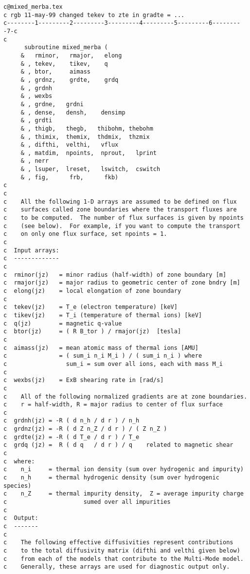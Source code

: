 \begin{verbatim}
c@mixed_merba.tex
c rgb 11-may-99 changed tekev to zte in gradte = ...
c--------1---------2---------3---------4---------5---------6---------7-c
c
      subroutine mixed_merba (
     &   rminor,   rmajor,   elong
     & , tekev,    tikev,    q       
     & , btor,     aimass
     & , grdnz,    grdte,    grdq 
     & , grdnh
     & , wexbs
     & , grdne,   grdni
     & , dense,   densh,    densimp     
     & , grdti  
     & , thigb,   thegb,   thibohm, thebohm
     & , thimix,  themix,  thdmix,  thzmix
     & , difthi,  velthi,   vflux
     & , matdim,  npoints,  nprout,   lprint  
     & , nerr
     & , lsuper,  lreset,   lswitch,  cswitch
     & , fig,      frb,      fkb)
c
c
c    All the following 1-D arrays are assumed to be defined on flux
c    surfaces called zone boundaries where the transport fluxes are
c    to be computed.  The number of flux surfaces is given by npoints
c    (see below).  For example, if you want to compute the transport
c    on only one flux surface, set npoints = 1.
c
c  Input arrays:
c  -------------
c
c  rminor(jz)   = minor radius (half-width) of zone boundary [m]
c  rmajor(jz)   = major radius to geometric center of zone bndry [m]
c  elong(jz)    = local elongation of zone boundary
c
c  tekev(jz)    = T_e (electron temperature) [keV] 
c  tikev(jz)    = T_i (temperature of thermal ions) [keV]
c  q(jz)        = magnetic q-value
c  btor(jz)     = ( R B_tor ) / rmajor(jz)  [tesla]
c
c  aimass(jz)   = mean atomic mass of thermal ions [AMU]
c               = ( sum_i n_i M_i ) / ( sum_i n_i ) where
c                 sum_i = sum over all ions, each with mass M_i
c
c  wexbs(jz)    = ExB shearing rate in [rad/s]
c
c    All of the following normalized gradients are at zone boundaries.
c    r = half-width, R = major radius to center of flux surface
c
c  grdnh(jz) = -R ( d n_h / d r ) / n_h
c  grdnz(jz) = -R ( d Z n_Z / d r ) / ( Z n_Z )
c  grdte(jz) = -R ( d T_e / d r ) / T_e
c  grdq (jz) =  R ( d q   / d r ) / q    related to magnetic shear
c
c  where:
c    n_i     = thermal ion density (sum over hydrogenic and impurity)
c    n_h     = thermal hydrogenic density (sum over hydrogenic species)
c    n_Z     = thermal impurity density,  Z = average impurity charge
c                      sumed over all impurities
c
c  Output:
c  -------
c
c    The following effective diffusivities represent contributions
c    to the total diffusivity matrix (difthi and velthi given below)
c    from each of the models that contribute to the Multi-Mode model.
c    Generally, these arrays are used for diagnostic output only.

\end{verbatim}
